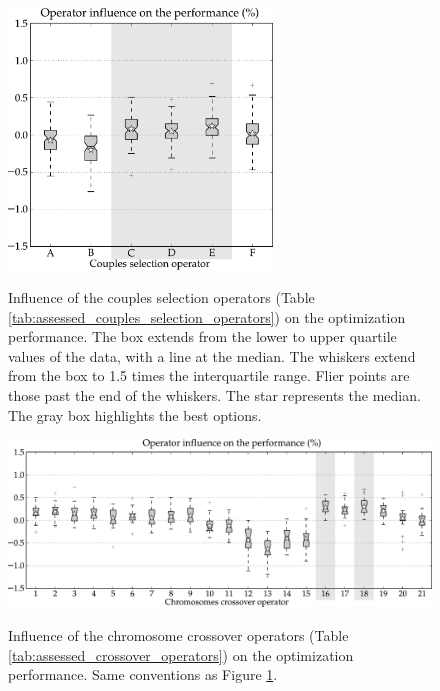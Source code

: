 \documentclass[twocol]{ametsoc}
\begin{document}
\begin{figure}[htb]
	\begin{center}
		\noindent\includegraphics[width=7cm,angle=0]{figures/operator_selectcoupl_score.pdf}\\
	\end{center}
	\caption{Influence of the couples selection operators (Table \ref{tab:assessed_couples_selection_operators}) on the optimization performance. The box extends from the lower to upper quartile values of the data, with a line at the median. The whiskers extend from the box to 1.5 times the interquartile range. Flier points are those past the end of the whiskers. The star represents the median. The gray box highlights the best options.}
	\label{fig:operator_selectcoupl_score}
\end{figure}


\begin{figure}[htb]
	\begin{center}
		\noindent\includegraphics[width=16cm,angle=0]{figures/operator_crossover_score.pdf}\\
	\end{center}
	\caption{Influence of the chromosome crossover operators (Table \ref{tab:assessed_crossover_operators}) on the optimization performance. Same conventions as Figure \ref{fig:operator_selectcoupl_score}.}
	\label{fig:operator_crossover_score}
\end{figure}
\end{document}
